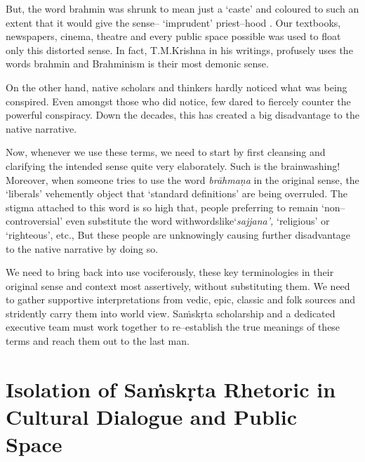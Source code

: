 But, the word brahmin was shrunk to mean just a ‘caste’ and coloured to such an extent that it would give the sense– ‘imprudent’ priest–hood . Our textbooks, newspapers, cinema, theatre and every public space possible was used to float only this distorted sense. In fact, T.M.Krishna in his writings, profusely uses the words brahmin and Brahminism is their most demonic sense.

On the other hand, native scholars and thinkers hardly noticed what was being conspired. Even amongst those who did notice, few dared to fiercely counter the powerful conspiracy. Down the decades, this has created a big disadvantage to the native narrative.

Now, whenever we use these terms, we need to start by first cleansing and clarifying the intended sense quite very elaborately. Such is the brainwashing! Moreover, when someone tries to use the word \textit{brāhmaṇa} in the original sense, the ‘liberals’ vehemently object that ‘standard definitions’ are being overruled. The stigma attached to this word is so high that, people preferring to remain ‘non–controversial’ even substitute the word withwordslike‘\textit{sajjana’,} ‘religious’ or ‘righteous’, etc., But these people are unknowingly causing further disadvantage to the native narrative by doing so.

We need to bring back into use vociferously, these key terminologies in their original sense and context most assertively, without substituting them. We need to gather supportive interpretations from vedic, epic, classic and folk sources and stridently carry them into world view. Saṁskṛta scholarship and a dedicated executive team must work together to re–establish the true meanings of these terms and reach them out to the last man.

\vspace{-.3cm}

\section*{Isolation of Saṁskṛta Rhetoric in Cultural Dialogue and Public Space}

